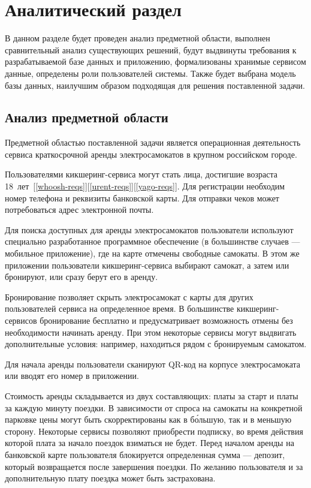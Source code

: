 \chapter{Аналитический раздел}

В данном разделе будет проведен анализ предметной области, выполнен сравнительный анализ существующих решений, будут выдвинуты требования к разрабатываемой базе данных и приложению, формализованы хранимые сервисом данные, определены роли пользователей системы. Также будет выбрана модель базы данных, наилучшим образом подходящая для решения поставленной задачи.

\section{Анализ предметной области}

Предметной областью поставленной задачи является операционная деятельность сервиса краткосрочной аренды электросамокатов в крупном российском городе.

Пользователями кикшеринг-сервиса могут стать лица, достигшие возраста 18~лет~[\ref{whoosh-reqs}][\ref{urent-reqs}][\ref{yago-reqs}]. Для регистрации необходим номер телефона и реквизиты банковской карты. Для отправки чеков может потребоваться адрес электронной почты.

Для поиска доступных для аренды электросамокатов пользователи используют специально разработанное программное обеспечение (в большинстве случаев --- мобильное приложение), где на карте отмечены свободные самокаты. В этом же приложении пользователи кикшеринг-сервиса выбирают самокат, а затем или бронируют, или сразу берут его в аренду.

Бронирование позволяет скрыть электросамокат с карты для других пользователей сервиса на определенное время. В большинстве кикшеринг-сервисов бронирование бесплатно и предусматривает возможность отмены без необходимости начинать аренду. При этом некоторые сервисы могут выдвигать дополнительные условия: например, находиться рядом с бронируемым самокатом.

Для начала аренды пользователи сканируют QR-код на корпусе электросамоката или вводят его номер в приложении.

Стоимость аренды складывается из двух составляющих: платы за старт и платы за каждую минуту поездки. В зависимости от спроса на самокаты на конкретной парковке цены могут быть скорректированы как в б\'{о}льшую, так и в меньшую сторону. Некоторые сервисы позволяют приобрести подписку, во время действия которой плата за начало поездок взиматься не будет. Перед началом аренды на банковской карте пользователя блокируется определенная сумма --- депозит, который возвращается после завершения поездки. По желанию пользователя и за дополнительную плату поездка может быть застрахована.

